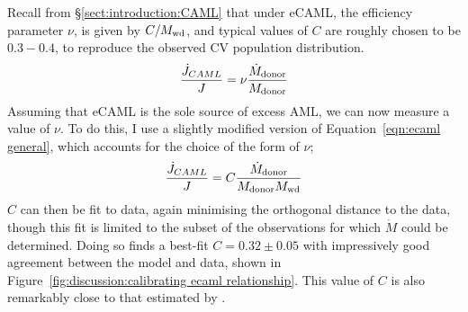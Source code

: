 

Recall from \S\ref{sect:introduction:CAML} that under eCAML, the efficiency parameter $\nu$, is given by $C/M_{\rm wd}$, and typical values of $C$ are roughly chosen to be $0.3 - 0.4$, to reproduce the observed CV population distribution.
\begin{equation}
    \label{eqn:ecaml general}
    \frac{\dot J_{CAML}}{J} = \nu \frac{\dot M_{\rm donor}}{M_{\rm donor}}
\end{equation}
Assuming that eCAML is the sole source of excess AML, we can now measure a value of $\nu$. To do this, I use a slightly modified version of Equation~\ref{eqn:ecaml general}, which accounts for the choice of the form of $\nu$;
\begin{equation}
    \frac{\dot J_{CAML}}{J} = C \frac{\dot M_{\rm donor}}{M_{\rm donor} M_{\rm wd}}
\end{equation}
$C$ can then be fit to data, again minimising the orthogonal distance to the data, though this fit is limited to the subset of the observations for which $\dot M$ could be determined.
Doing so finds a best-fit $C = 0.32 \pm0.05$ with impressively good agreement between the model and data, shown in Figure~\ref{fig:discussion:calibrating ecaml relationship}. This value of $C$ is also remarkably close to that estimated by \citet{Schreiber2016}. 
